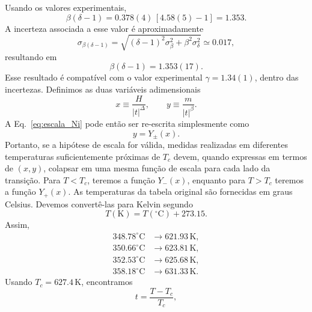 \documentclass[11pt,a4paper]{article}
\begin{document}
%
Usando os valores experimentais,
%
\begin{equation}
    \beta(\delta-1)
    =
    0.378(4)\,[4.58(5)-1]
    =
    1.353.
\end{equation}
%
A incerteza associada a esse valor é aproximadamente
%
\begin{equation}
    \sigma_{\beta(\delta-1)}
    =
    \sqrt{
        (\delta-1)^2\sigma_\beta^2
        +
        \beta^2\sigma_\delta^2
    }
    \simeq0.017,
\end{equation}
%
resultando em
%
\begin{equation}
    \beta(\delta-1)=1.353(17).
\end{equation}
%
Esse resultado é compatível com o valor experimental $\gamma=1.34(1)$, dentro das incertezas. Definimos as duas variáveis adimensionais
%
\begin{equation}
    x
    \equiv
    \frac{H}{|t|^\Delta},
    \qquad
    y
    \equiv
    \frac{m}{|t|^\beta}.
    \label{eq:xy_Ni}
\end{equation}
%
A Eq.~\eqref{eq:escala_Ni} pode então ser re-escrita simplesmente como
%
\begin{equation}
    y=Y_{\pm}(x).
    \label{eq:collapse_function_Ni}
\end{equation}
%
Portanto, se a hipótese de escala for válida, medidas realizadas em
diferentes temperaturas suficientemente próximas de $T_c$ devem,
quando expressas em termos de $(x,y)$, colapsar em uma mesma função de
escala para cada lado da transição. Para $T<T_c$, teremos a função $Y_-(x)$, enquanto para $T>T_c$ teremos
a função $Y_+(x)$.
%
As temperaturas da tabela original são fornecidas em graus Celsius.
Devemos convertê-las para Kelvin segundo
%
\begin{equation}
    T(\mathrm{K})
    =
    T(^\circ\mathrm{C})+273.15.
\end{equation}
%
Assim,
%
\begin{align}
    348.78^\circ\mathrm{C}
    &\longrightarrow
    621.93\,\mathrm{K},
    \\
    350.66^\circ\mathrm{C}
    &\longrightarrow
    623.81\,\mathrm{K},
    \\
    352.53^\circ\mathrm{C}
    &\longrightarrow
    625.68\,\mathrm{K},
    \\
    358.18^\circ\mathrm{C}
    &\longrightarrow
    631.33\,\mathrm{K}.
\end{align}
%
Usando $T_c=627.4\,\mathrm K$, encontramos
%
\begin{equation}
    t=\frac{T-T_c}{T_c},
\end{equation}
\end{document}
